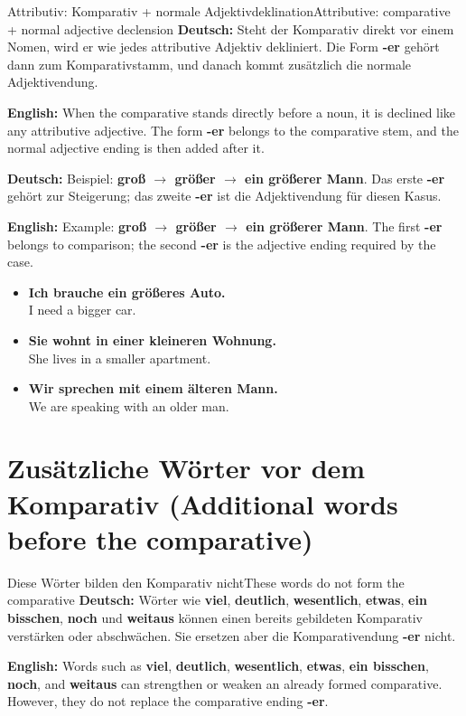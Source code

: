 \documentclass[a4paper,11pt]{article}
\newcommand{\GermanText}[1]{\textbf{Deutsch: }#1\par}
\newcommand{\EnglishText}[1]{{\small\color{SoftGray}\textbf{English: }#1\par}}
\newcommand{\ExampleItem}[2]{\item \textbf{#1}\\{\small\color{SoftGray}#2}}
\begin{document}
      \begin{grammarentry}{Attributiv: Komparativ + normale Adjektivdeklination}{Attributive: comparative + normal adjective declension}
         \GermanText{Steht der Komparativ direkt vor einem Nomen, wird er wie jedes attributive Adjektiv dekliniert. Die Form \textbf{-er} gehört dann zum Komparativstamm, und danach kommt zusätzlich die normale Adjektivendung.}
         \EnglishText{When the comparative stands directly before a noun, it is declined like any attributive adjective. The form \textbf{-er} belongs to the comparative stem, and the normal adjective ending is then added after it.}

         \GermanText{Beispiel: \textbf{groß $\rightarrow$ größer $\rightarrow$ ein größerer Mann}. Das erste \textbf{-er} gehört zur Steigerung; das zweite \textbf{-er} ist die Adjektivendung für diesen Kasus.}
         \EnglishText{Example: \textbf{groß $\rightarrow$ größer $\rightarrow$ ein größerer Mann}. The first \textbf{-er} belongs to comparison; the second \textbf{-er} is the adjective ending required by the case.}
      \end{grammarentry}

      \begin{exbox}
         \begin{itemize}
            \ExampleItem{Ich brauche ein größeres Auto.}{I need a bigger car.}
            \ExampleItem{Sie wohnt in einer kleineren Wohnung.}{She lives in a smaller apartment.}
            \ExampleItem{Wir sprechen mit einem älteren Mann.}{We are speaking with an older man.}
         \end{itemize}
      \end{exbox}

   \section{Zusätzliche Wörter vor dem Komparativ \textnormal{(Additional words before the comparative)}}

      \begin{grammarentry}{Diese Wörter bilden den Komparativ nicht}{These words do not form the comparative}
         \GermanText{Wörter wie \textbf{viel}, \textbf{deutlich}, \textbf{wesentlich}, \textbf{etwas}, \textbf{ein bisschen}, \textbf{noch} und \textbf{weitaus} können einen bereits gebildeten Komparativ verstärken oder abschwächen. Sie ersetzen aber die Komparativendung \textbf{-er} nicht.}
         \EnglishText{Words such as \textbf{viel}, \textbf{deutlich}, \textbf{wesentlich}, \textbf{etwas}, \textbf{ein bisschen}, \textbf{noch}, and \textbf{weitaus} can strengthen or weaken an already formed comparative. However, they do not replace the comparative ending \textbf{-er}.}
      \end{grammarentry}
\end{document}
